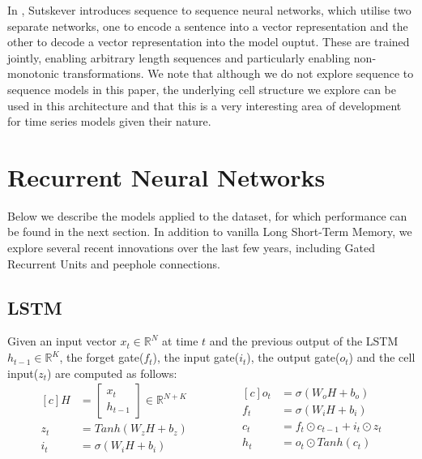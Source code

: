 \documentclass{article} %
\begin{document}
In \cite{Sutskever}, Sutskever introduces sequence to sequence neural networks, which utilise two separate networks, one to encode a sentence into a vector representation and the other to decode a vector representation into the model ouptut. These are trained jointly, enabling arbitrary length sequences and particularly enabling non-monotonic transformations. We note that although we do not explore sequence to sequence models in this paper, the underlying cell structure we explore can be used in this architecture and that this is a very interesting area of development for time series models given their nature.  

\section{Recurrent Neural Networks}
\label{sec:nn}

Below we describe the models applied to the dataset, for which performance can be found in the next section. In addition to vanilla Long Short-Term Memory, we explore several recent innovations over the last few years, including Gated Recurrent Units and peephole connections. 



\subsection{LSTM}
\label{sec:nn/lstm}


Given an input vector $x_{t} \in \mathbb{R}^{N}$ at time $t$ and the previous output of the LSTM $h_{t-1} \in \mathbb{R}^{K}$, the forget gate($f_{t}$), the input gate($i_{t}$), the output gate($o_{t}$) and the cell input($z_{t}$) are computed as follows:
\begin{equation}
\begin{aligned}[c]
    H &= \left[ \begin{array}{cc}
         x_{t}  \\
         h_{t-1} 
    \end{array} \right] \in \mathbb{R}^{N+K} \\
    z_{t} &= Tanh(W_{z}H + b_{z}) \\
    i_{t} &= \sigma(W_{i}H + b_{i})\\
    \end{aligned}
    \qquad \qquad
    \begin{aligned}[c]
    o_{t} &= \sigma(W_{o}H + b_{o})\\
    f_{t} &= \sigma(W_{i}H + b_{i})\\
    c_{t} &= f_{t} \odot c_{t-1} + i_{t} \odot z_{t} \\
    h_{t} &= o_{t} \odot Tanh(c_{t}) \\
    \end{aligned}
\end{equation}
\end{document}
